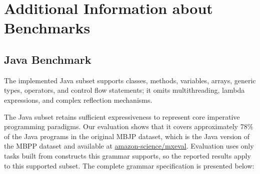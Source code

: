 \section{Additional Information about Benchmarks}
\label{appendix-benchmark}

\subsection{Java Benchmark}
The implemented Java subset supports classes, methods, variables, arrays, generic types, operators, and control flow statements; it omits multithreading, lambda expressions, and complex reflection mechanisms.

The Java subset retains sufficient expressiveness to represent core imperative programming paradigms. Our evaluation shows that it covers approximately 78\% of the Java programs in the original MBJP dataset, which is the Java version of the MBPP dataset and available at \href{https://github.com/amazon-science/mxeval}{amazon-science/mxeval}.
Evaluation uses only tasks built from constructs this grammar supports, so the reported results apply to this supported subset.
The complete grammar specification is presented below:

